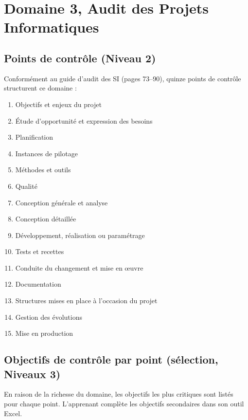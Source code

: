 \section{Domaine 3, Audit des Projets Informatiques}
\label{sec:decomp-projets}

\subsection{Points de contrôle (Niveau 2)}

Conformément au guide d'audit des SI (pages 73--90), quinze points de contrôle structurent ce domaine :

\begin{enumerate}
    \item Objectifs et enjeux du projet
    \item Étude d'opportunité et expression des besoins
    \item Planification
    \item Instances de pilotage
    \item Méthodes et outils
    \item Qualité
    \item Conception générale et analyse
    \item Conception détaillée
    \item Développement, réalisation ou paramétrage
    \item Tests et recettes
    \item Conduite du changement et mise en œuvre
    \item Documentation
    \item Structures mises en place à l'occasion du projet
    \item Gestion des évolutions
    \item Mise en production
\end{enumerate}

\subsection{Objectifs de contrôle par point (sélection, Niveaux 3)}

En raison de la richesse du domaine, les objectifs les plus critiques sont listés pour chaque point. L'apprenant complète les objectifs secondaires dans son outil Excel.


